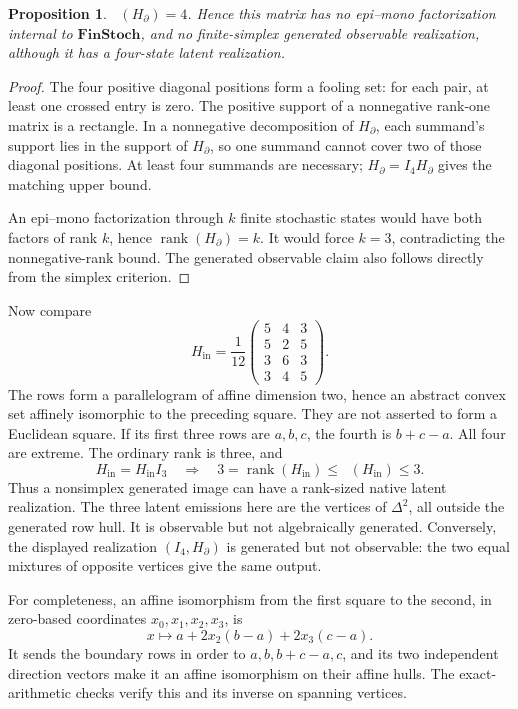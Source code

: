 \documentclass[11pt]{article}
\newtheorem{proposition}[theorem]{Proposition}
\DeclareMathOperator{\rank}{rank}
\DeclareMathOperator{\nnrank}{rank_+}
\newcommand{\FinStoch}{\mathbf{FinStoch}}
\begin{document}
\begin{proposition}
$\nnrank(H_{\partial})=4$. Hence this matrix has no epi--mono factorization internal to $\FinStoch$, and no finite-simplex generated observable realization, although it has a four-state latent realization.
\end{proposition}
\begin{proof}
The four positive diagonal positions form a fooling set: for each pair, at least one crossed entry is zero. The positive support of a nonnegative rank-one matrix is a rectangle. In a nonnegative decomposition of $H_{\partial}$, each summand's support lies in the support of $H_{\partial}$, so one summand cannot cover two of those diagonal positions. At least four summands are necessary; $H_{\partial}=I_4H_{\partial}$ gives the matching upper bound.

An epi--mono factorization through $k$ finite stochastic states would have both factors of rank $k$, hence $\rank(H_{\partial})=k$. It would force $k=3$, contradicting the nonnegative-rank bound. The generated observable claim also follows directly from the simplex criterion.
\end{proof}

Now compare
\[
 H_{\mathrm{in}}=\frac1{12}
 \begin{pmatrix}
 5&4&3\\5&2&5\\3&6&3\\3&4&5
 \end{pmatrix}.
\]
The rows form a parallelogram of affine dimension two, hence an abstract convex set affinely isomorphic to the preceding square. They are not asserted to form a Euclidean square. If its first three rows are $a,b,c$, the fourth is $b+c-a$. All four are extreme. The ordinary rank is three, and
\[
 H_{\mathrm{in}}=H_{\mathrm{in}}I_3
 \quad\Longrightarrow\quad
 3=\rank(H_{\mathrm{in}})\leq\nnrank(H_{\mathrm{in}})\leq3.
\]
Thus a nonsimplex generated image can have a rank-sized native latent realization. The three latent emissions here are the vertices of $\Delta^2$, all outside the generated row hull. It is observable but not algebraically generated. Conversely, the displayed realization $(I_4,H_{\partial})$ is generated but not observable: the two equal mixtures of opposite vertices give the same output.

For completeness, an affine isomorphism from the first square to the second, in zero-based coordinates $x_0,x_1,x_2,x_3$, is
\[
 x\longmapsto a+2x_2(b-a)+2x_3(c-a).
\]
It sends the boundary rows in order to $a,b,b+c-a,c$, and its two independent direction vectors make it an affine isomorphism on their affine hulls. The exact-arithmetic checks verify this and its inverse on spanning vertices.
\end{document}

